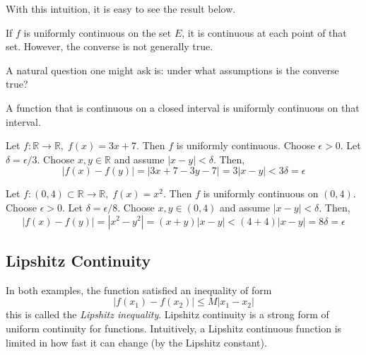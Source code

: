   With this intuition, it is easy to see the result below. 

  \begin{lemma}
    If $f$ is uniformly continuous on the set $E$, it is continuous at each point of that set. However, the converse is not generally true. 
  \end{lemma}

  A natural question one might ask is: under what assumptions is the converse true?  

  \begin{theorem}
    A function that is continuous on a closed interval is uniformly continuous on that interval. 
  \end{theorem}

  \begin{example}
    Let $f: \mathbb{R} \longrightarrow \mathbb{R}, \; f(x) = 3x+7$. Then $f$ is uniformly continuous. Choose $\epsilon > 0$. Let $\delta = \epsilon / 3$. Choose $x, y \in \mathbb{R}$ and assume $|x-y| < \delta$. Then, 
    \begin{equation}
      | f(x) - f(y) | = | 3x + 7 - 3 y - 7 | = 3 |x-y| < 3 \delta = \epsilon
    \end{equation}
  \end{example}

  \begin{example}
    Let $f: (0, 4) \subset \mathbb{R} \longrightarrow \mathbb{R}, \; f(x) = x^2$. Then $f$ is uniformly continuous on $(0, 4)$. Choose $\epsilon > 0$. Let $\delta = \epsilon / 8$. Choose $x, y \in (0, 4)$ and assume $|x-y| < \delta$. Then, 
    \begin{equation}
      |f(x) - f(y)| = |x^2 - y^2| = (x+y) |x-y| < (4+4) |x-y| = 8\delta = \epsilon
    \end{equation}
  \end{example}

\subsection{Lipshitz Continuity}

  In both examples, the function satisfied an inequality of form 
  \begin{equation}
    |f(x_1) - f(x_2)| \leq M |x_1 - x_2|
  \end{equation}
  this is called the \textit{Lipshitz inequality}. Lipshitz continuity is a strong form of uniform continuity for functions. Intuitively, a Lipshitz continuous function is limited in how fast it can change (by the Lipshitz constant). 

